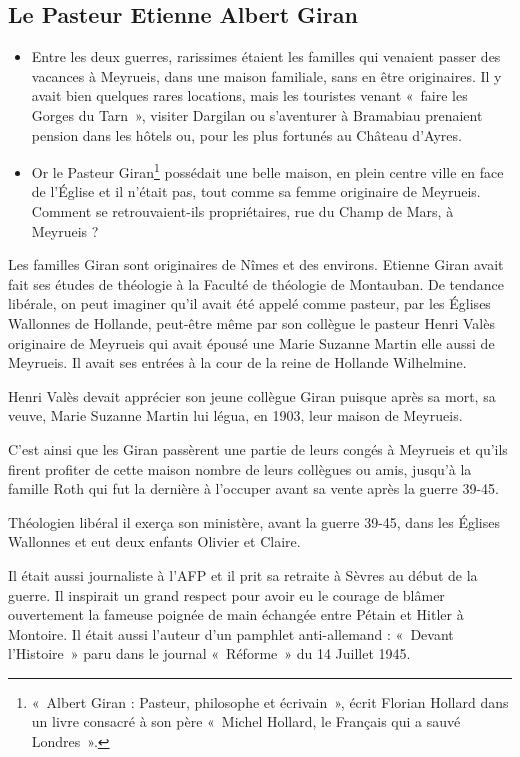 \subsection{Le Pasteur Etienne Albert Giran}


\begin{itemize}
\item Entre les deux guerres, rarissimes étaient les familles qui venaient passer des vacances
à Meyrueis, dans une maison familiale, sans en être originaires. Il y avait bien
quelques rares locations, mais les touristes venant «~faire les Gorges du Tarn~», visiter
Dargilan ou s’aventurer à Bramabiau prenaient pension dans les hôtels ou, pour les
plus fortunés au Château d’Ayres.

\item Or le Pasteur Giran\footnote{«~Albert Giran : Pasteur, philosophe et écrivain~», écrit Florian Hollard dans un livre consacré à son père «~Michel Hollard, le Français qui a sauvé Londres~».} possédait une belle maison, en plein centre ville en face de
l’Église et il n’était pas, tout comme sa femme originaire de Meyrueis. Comment se
retrouvaient-ils propriétaires, rue du Champ de Mars, à Meyrueis ?
\end{itemize}

Les familles Giran sont originaires de Nîmes et des environs. Etienne Giran avait fait ses
études de théologie à la Faculté de théologie de Montauban. De tendance libérale, on peut
imaginer qu’il avait été appelé comme pasteur, par les Églises Wallonnes de Hollande, peut-être même par son collègue le pasteur Henri Valès originaire de Meyrueis qui avait épousé
une Marie Suzanne Martin elle aussi de Meyrueis. Il avait ses entrées à la cour de la reine de
Hollande Wilhelmine.

Henri Valès devait apprécier son jeune collègue Giran puisque après sa mort, sa veuve, Marie
Suzanne Martin lui légua, en 1903, leur maison de Meyrueis.

C’est ainsi que les Giran passèrent une partie de leurs congés à Meyrueis et qu’ils firent
profiter de cette maison nombre de leurs collègues ou amis, jusqu’à la famille Roth qui fut la
dernière à l’occuper avant sa vente après la guerre 39-45.


Théologien libéral il exerça son ministère, avant la guerre 39-45, dans les Églises Wallonnes
et eut deux enfants Olivier et Claire.

Il était aussi journaliste à l’AFP et il prit sa retraite à Sèvres au début de la guerre. Il inspirait
un grand respect pour avoir eu le courage de blâmer ouvertement la fameuse poignée de main
échangée entre Pétain et Hitler à Montoire. Il était aussi l’auteur d’un pamphlet anti-allemand :
«~Devant l’Histoire~» paru dans le journal «~Réforme~» du 14 Juillet 1945.


